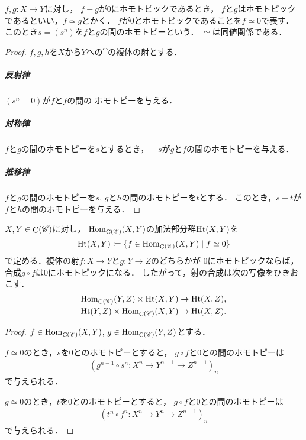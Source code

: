 $f,g\colon X\to Y$に対し，
$f-g$が0にホモトピックであるとき，
$f$と$g$はホモトピックであるといい，$f\simeq g$とかく．
$f$が0とホモトピックであることを$f\simeq0$で表す．
このとき$s=(s^n)$を$f$と$g$の間のホモトピーという．
$\simeq$は同値関係である．
\begin{proof}$f,g,h$を$X$から$Y$への$\cat$の複体の射とする．
    \subparagraph*{反射律}$(s^n=0)$が$f$と$f$の間の
    ホモトピーを与える．

    \subparagraph*{対称律}
    $f$と$g$の間のホモトピーを$s$とするとき，
    $-s$が$g$と$f$の間のホモトピーを与える．

    \subparagraph*{推移律}$f$と$g$の間のホモトピーを$s$, 
    $g$と$h$の間のホモトピーを$t$とする．
    このとき，$s+t$が$f$と$h$の間のホモトピーを与える．
\end{proof}

\begin{Proposition}\label{prop:ht}
    $X,Y\in\mathop{\mathrm{C}}\nolimits(\mathscr{C})$に対し，
    $\mathop{\mathrm{Hom}}\nolimits_{\mathop{\mathrm{C}}\nolimits(\mathscr{C})}(X,Y)$の加法部分群$\mathop{\mathrm{Ht}}\nolimits(X,Y)$を
    \begin{equation}
        \mathop{\mathrm{Ht}}\nolimits(X,Y)\coloneqq\{f\in\mathop{\mathrm{Hom}}\nolimits_{\mathop{\mathrm{C}}\nolimits(\mathscr{C})}(X,Y)\mid f\simeq 0\}
    \end{equation}
    で定める．複体の射$f\colon X\to Y$と$g\colon Y\to Z$のどちらかが
    0にホモトピックならば，合成$g\circ f$は$0$にホモトピックになる．
    したがって，射の合成は次の写像をひきおこす．
    \begin{align*}
        \mathop{\mathrm{Hom}}\nolimits_{\mathop{\mathrm{C}}\nolimits(\mathscr{C})}(Y,Z)\times\mathop{\mathrm{Ht}}\nolimits(X,Y)\to\mathop{\mathrm{Ht}}\nolimits(X,Z),\\
        \mathop{\mathrm{Ht}}\nolimits(Y,Z)\times\mathop{\mathrm{Hom}}\nolimits_{\mathop{\mathrm{C}}\nolimits(\mathscr{C})}(X,Y)\to\mathop{\mathrm{Ht}}\nolimits(X,Z).
    \end{align*}        
\end{Proposition}
\begin{proof}$f\in\mathop{\mathrm{Hom}}\nolimits_{\mathop{\mathrm{C}}\nolimits(\mathscr{C})}(X,Y)$, 
    $g\in\mathop{\mathrm{Hom}}\nolimits_{\mathop{\mathrm{C}}\nolimits(\mathscr{C})}(Y,Z)$とする．
    
    $f\simeq 0$のとき，$s$を0とのホモトピーとすると，
    $g\circ f$と0との間のホモトピーは
    \begin{align*}
        (g^{n-1}\circ s^{n}\colon X^n\to Y^{n-1}\to Z^{n-1})_n
    \end{align*}
    で与えられる．

    $g\simeq 0$のとき，$t$を0とのホモトピーとすると，
    $g\circ f$と0との間のホモトピーは
    \begin{align*}
        (t^{n}\circ f^{n}\colon X^n\to Y^{n}\to Z^{n-1})_n
    \end{align*}
    で与えられる．
\end{proof}

